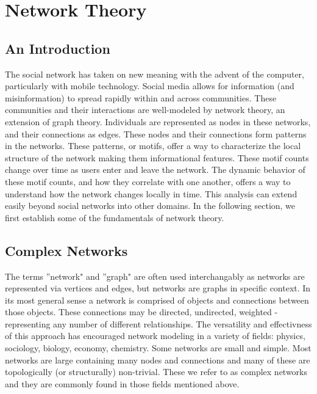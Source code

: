 %

\chapter{Network Theory}

\section{An Introduction}
The social network has taken on new meaning with the advent of the computer, particularly with 
mobile technology. Social media allows for information (and misinformation) to spread rapidly
within and across communities. These communities and their interactions are well-modeled by network theory, an extension of graph theory.
Individuals are represented as nodes in these networks, and their connections as edges. These nodes and their
connections form patterns in the networks. These patterns, or motifs, offer
a way to characterize the local structure of the network making them informational features. These motif counts change
over time as users enter and leave the network. The dynamic behavior of these motif counts, and how they correlate with 
one another, offers a way to understand how the network changes locally in time. This analysis can 
extend easily beyond social networks into other domains. In the following section, we first establish 
some of the fundamentals of network theory.


\section{Complex Networks}
The terms ''network" and ''graph" are often used interchangably as networks are represented
via vertices and edges, but networks are graphs in specific context. In its 
most general sense a network is comprised of objects and connections between those objects. These
connections may be directed, undirected, weighted - representing any number of different relationships. 
The versatility and effectivness of this approach has encouraged network modeling in a 
variety of fields: physics, sociology, biology, economy, chemistry.
Some networks are small and simple. Most networks are large containing many nodes and connections and many of these are
topologically (or structurally) non-trivial. These we refer to as complex networks and they are 
commonly found in those fields mentioned above. 

